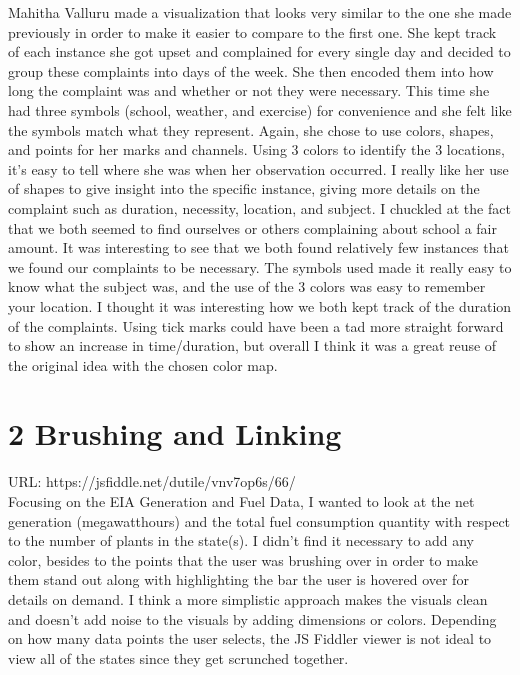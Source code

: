 \documentclass{neu_handout}
\begin{document}
Mahitha Valluru made a visualization that looks very similar to the one she made previously in order to make it easier to compare to the first one. She kept track of each instance she got upset and complained for every single day and decided to group these complaints into days of the week. She then encoded them into how long the complaint was and whether or not they were necessary. This time she had three symbols (school, weather, and exercise) for convenience and she felt like the symbols match what they represent. Again, she chose to use colors, shapes, and points for her marks and channels. Using 3 colors to identify the 3 locations, it’s easy to tell where she was when her observation occurred. I really like her use of shapes to give insight into the specific instance, giving more details on the complaint such as duration, necessity, location, and subject. I chuckled at the fact that we both seemed to find ourselves or others complaining about school a fair amount. It was interesting to see that we both found relatively few instances that we found our complaints to be necessary. The symbols used made it really easy to know what the subject was, and the use of the 3 colors was easy to remember your location. I thought it was interesting how we both kept track of the duration of the complaints. Using tick marks could have been a tad more straight forward to show an increase in time/duration, but overall I think it was a great reuse of the original idea with the chosen color map.


\section*{2 Brushing and Linking}

URL: https://jsfiddle.net/dutile/vnv7op6s/66/\\

Focusing on the EIA Generation and Fuel Data, I wanted to look at the net generation (megawatthours) and the total fuel consumption quantity with respect to the number of plants in the state(s). I didn't find it necessary to add any color, besides to the points that the user was brushing over in order to make them stand out along with highlighting the bar the user is hovered over for details on demand. I think a more simplistic approach makes the visuals clean and doesn't add noise to the visuals by adding dimensions or colors. Depending on how many data points the user selects, the JS Fiddler viewer is not ideal to view all of the states since they get scrunched together.
\end{document}
